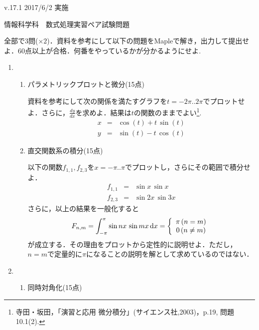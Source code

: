 \documentclass[12pt,a4j]{jarticle}
\begin{document}
\small{v.17.1}
\hfill\small{2017/6/2 実施}
\begin{center}
{\gt\large{情報科学科　数式処理実習ペア試験問題}}
\end{center}
\vspace{5mm}

全部で3問($\times 2$)．資料を参考にして以下の問題をMapleで解き，出力して提出せよ．60点以上が合格．何番をやっているかが分かるようにせよ.

\begin{enumerate}
\item 
\begin{enumerate}
\item パラメトリックプロットと微分(15点) 

資料を参考にして次の関係を満たすグラフを$t=-2\pi..2\pi$でプロットせよ．さらに，$\displaystyle \frac{dy}{dx}$を求めよ．結果は$t$の関数のままでよい\footnote{寺田・坂田，「演習と応用 微分積分」(サイエンス社,2003)，p.19, 問題10.1(2).}.
\begin{eqnarray*}
x &=& \cos(t) + t \, \sin(t)\\
y &=& \sin(t) - t \, \cos(t)
\end{eqnarray*}

\item 直交関数系の積分(15点)

以下の関数$f_{1,1}, f_{2,3}$を$x=-\pi..\pi$でプロットし，さらにその範囲で積分せよ．
\begin{eqnarray*}
f_{1,1} &=& \sin x \, \sin x\\
f_{2,3} &=& \sin 2x \, \sin 3x
\end{eqnarray*}
さらに，以上の結果を一般化すると
\begin{equation*}
F_{n,m} = \int_{-\pi}^{\pi} \sin nx \, \sin mx \, {\textrm d}x =
\left\{ \begin{array}{cc}
\pi \, (n=m) \\
0 \, (n\ne m)
\end{array}
\right.
\end{equation*}
が成立する．その理由をプロットから定性的に説明せよ．ただし，$n=m$で定量的に$\pi$になることの説明を解として求めているのではない．
\end{enumerate}
\item
\begin{enumerate}
\item 同時対角化(15点)


\end{enumerate}
\end{enumerate}
\end{document}
